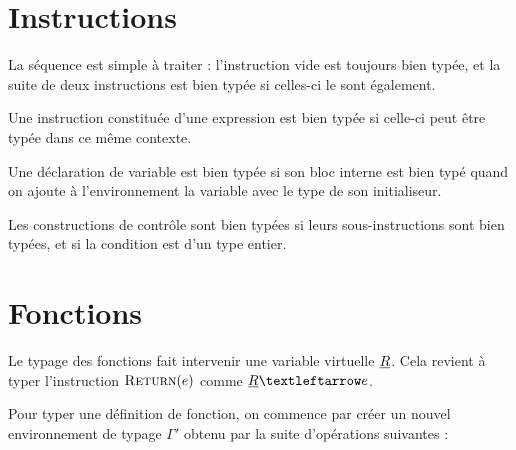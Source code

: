 \begin{mathpar}
\end{mathpar}

\section{Instructions}

La séquence est simple à traiter : l'instruction vide est toujours bien typée,
et la suite de deux instructions est bien typée si celles-ci le sont également.

\begin{mathpar}

\end{mathpar}

Une instruction constituée d'une expression est bien typée si celle-ci peut être
typée dans ce même contexte.

\begin{mathpar}
\end{mathpar}

Une déclaration de variable est bien typée si son bloc interne est bien typé
quand on ajoute à l'environnement la variable avec le type de son initialiseur.

\begin{mathpar}
\end{mathpar}

Les constructions de contrôle sont bien typées si leurs sous-instructions sont
bien typées, et si la condition est d'un type entier.

\begin{mathpar}

\end{mathpar}

\section{Fonctions}

Le typage des fonctions fait intervenir une variable virtuelle $\vRet$. Cela
revient à typer l'instruction $\iReturn{e}$ comme $\vRet ← e$.

\begin{mathpar}
\end{mathpar}

Pour typer une définition de fonction, on commence par créer un nouvel
environnement de typage $Γ'$ obtenu par la suite d'opérations suivantes :

